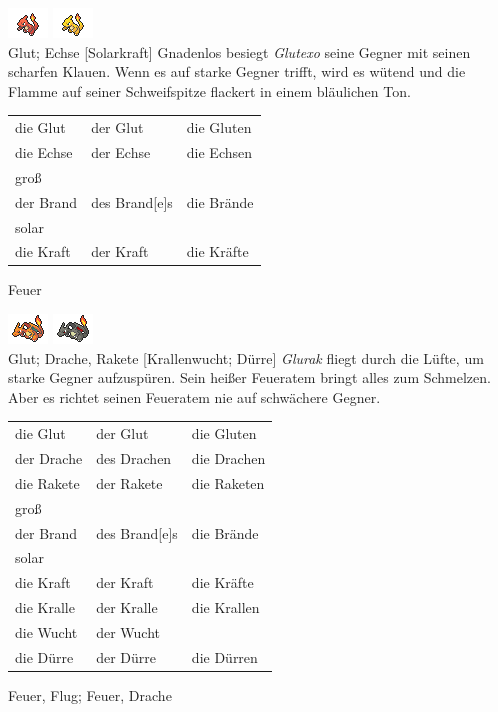 \documentclass[a7paper,10pt,%
,toc
,print
]{kartei}
\begin{document}
\begin{karte}[Großbrand]{
\includegraphics{../regular/charmeleon}
\includegraphics{../shiny/charmeleon} \\
Glut; Echse
}[Solarkraft]
Gnadenlos besiegt \emph{Glutexo} seine Gegner mit seinen scharfen Klauen. Wenn 
es auf starke Gegner trifft, wird es wütend und die Flamme auf seiner 
Schweifspitze flackert in einem bläulichen Ton.

\vspace{5pt}
\begin{tabular}{lll}
die Glut	&	der Glut	&	die Gluten \\
die Echse	&	der Echse	&	die Echsen \\
groß \\
der Brand	&	des Brand[e]s	&	die Brände \\
solar \\
die Kraft	&	der Kraft	&	die Kräfte \\
\end{tabular}
\vspace{5pt}

Feuer
\end{karte}


\begin{karte}{
\includegraphics{../regular/charizard}
\includegraphics{../shiny/charizard} \\
Glut; Drache, Rakete
}[Krallenwucht; Dürre]
\emph{Glurak} fliegt durch die Lüfte, um starke Gegner aufzuspüren. Sein heißer 
Feueratem bringt alles zum Schmelzen. Aber es richtet seinen Feueratem nie auf 
schwächere Gegner.

\vspace{5pt}
\begin{tabular}{lll}
die Glut	&	der Glut	&	die Gluten \\
der Drache	&	des Drachen	&	die Drachen \\
die Rakete	&	der Rakete	&	die Raketen	\\
groß \\
der Brand	&	des Brand[e]s	&	die Brände \\
solar \\
die Kraft	&	der Kraft	&	die Kräfte \\
die Kralle	&	der Kralle	&	die Krallen \\
die Wucht	&	der Wucht	&	 \\
die Dürre	&	der Dürre	&	die Dürren
\end{tabular}
\vspace{5pt}

Feuer, Flug; Feuer, Drache
\end{karte}
\end{document}
